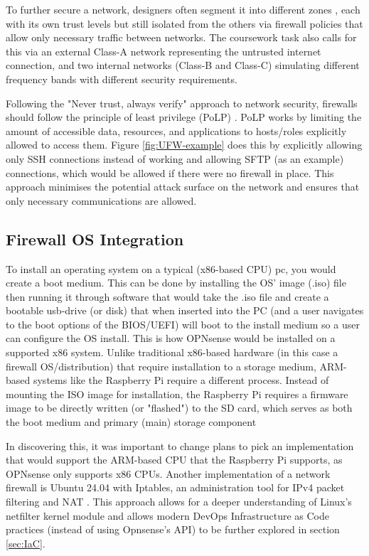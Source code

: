 To further secure a network, designers often segment it into different zones \parencite{paloalto2025privilege}, each with its own trust levels but still isolated from the others via firewall policies that allow only necessary traffic between networks. The coursework task also calls for this via an external Class-A network representing the untrusted internet connection, and two internal networks (Class-B and Class-C) simulating different frequency bands with different security requirements.

Following the "Never trust, always verify" approach \parencite{ravi2025beyond} to network security, firewalls should follow the principle of least privilege (PoLP) \parencite{paloalto2025segmentation}. PoLP works by limiting the amount of accessible data, resources, and applications to hosts/roles explicitly allowed to access them. Figure \ref{fig:UFW-example} does this by explicitly allowing only SSH connections instead of working and allowing SFTP (as an example) connections, which would be allowed if there were no firewall in place. This approach minimises the potential attack surface on the network and ensures that only necessary communications are allowed.

\subsection{Firewall OS Integration}
\label{subsec:os-integration}
To install an operating system on a typical (x86-based CPU) pc, you would create a boot medium. This can be done by installing the OS' image (.iso) file then running it through software that would take the .iso file and create a bootable usb-drive (or disk) that when inserted into the PC (and a user navigates to the boot options of the BIOS/UEFI) will boot to the install medium so a user can configure the OS install. This is how OPNsense would be installed on a supported x86 system. Unlike traditional x86-based hardware (in this case a firewall OS/distribution) that require installation to a storage medium, ARM-based systems like the Raspberry Pi require a different process. Instead of mounting the ISO image for installation, the Raspberry Pi requires a firmware image to be directly written (or "flashed") to the SD card, which serves as both the boot medium and primary (main) storage component

In discovering this, it was important to change plans to pick an implementation that would support the ARM-based CPU that the Raspberry Pi supports, as OPNsense only supports x86 CPUs. Another implementation of a network firewall is Ubuntu 24.04 with Iptables, an administration tool for IPv4 packet filtering and NAT \parencite{skilluped2020iptables}. This approach allows for a deeper understanding of Linux's netfilter kernel module and allows modern DevOps Infrastructure as Code practices (instead of using Opnsense's API) to be further explored in section \ref{sec:IaC}.

